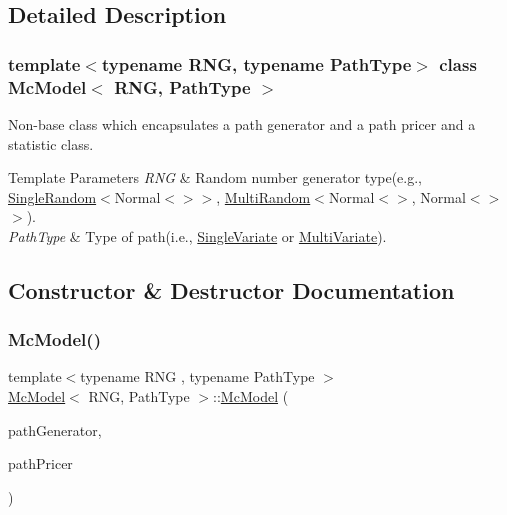 \subsection{Detailed Description}
\subsubsection*{template$<$typename R\+NG, typename Path\+Type$>$\newline
class Mc\+Model$<$ R\+N\+G, Path\+Type $>$}

Non-\/base class which encapsulates a path generator and a path pricer and a statistic class. 


\begin{DoxyTemplParams}{Template Parameters}
{\em R\+NG} & Random number generator type(e.\+g., \hyperlink{struct_single_random}{Single\+Random}$<$Normal$<$$>$$>$, \hyperlink{struct_multi_random}{Multi\+Random}$<$Normal$<$$>$, Normal$<$$>$$>$). \\
\hline
{\em Path\+Type} & Type of path(i.\+e., \hyperlink{struct_single_variate}{Single\+Variate} or \hyperlink{struct_multi_variate}{Multi\+Variate}). \\
\hline
\end{DoxyTemplParams}


\subsection{Constructor \& Destructor Documentation}
\hypertarget{class_mc_model_a2c4ccfd7b882e80516e1f9733243e48d}{}\label{class_mc_model_a2c4ccfd7b882e80516e1f9733243e48d} 
\subsubsection{\texorpdfstring{Mc\+Model()}{McModel()}}
{\footnotesize\ttfamily template$<$typename R\+NG , typename Path\+Type $>$ \\
\hyperlink{class_mc_model}{Mc\+Model}$<$ R\+NG, Path\+Type $>$\+::\hyperlink{class_mc_model}{Mc\+Model} (\begin{DoxyParamCaption}\item[{const std\+::shared\+\_\+ptr$<$ \hyperlink{class_path_generator}{Path\+Generator}$<$ R\+NG, Path\+Type $>$$>$ \&}]{path\+Generator,  }\item[{const std\+::shared\+\_\+ptr$<$ \hyperlink{class_path_pricer}{Path\+Pricer}$<$ Path\+Type $>$$>$}]{path\+Pricer }\end{DoxyParamCaption})}



